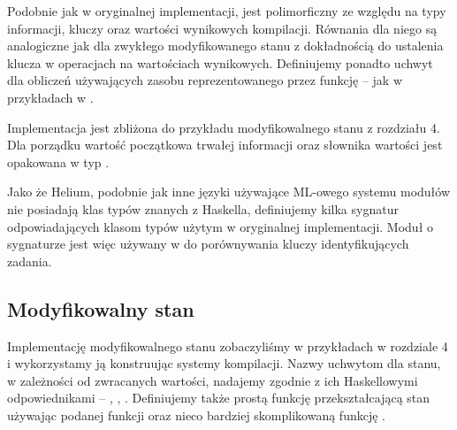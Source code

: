 Podobnie jak  w oryginalnej implementacji,  jest polimorficzny ze względu na typy informacji, kluczy oraz wartości wynikowych kompilacji. Równania dla niego są analogiczne jak dla zwykłego modyfikowanego stanu z dokładnością do ustalenia klucza w operacjach na wartościach wynikowych. Definiujemy ponadto uchwyt  dla obliczeń używających zasobu reprezentowanego przez funkcję -- jak w przykładach w \BSaLC.



Implementacja jest zbliżona do przykładu modyfikowalnego stanu z rozdziału 4. Dla porządku wartość początkowa trwałej informacji oraz słownika wartości jest opakowana w typ .

Jako że Helium, podobnie jak inne języki używające ML-owego systemu modułów nie posiadają klas typów znanych z Haskella, definiujemy kilka sygnatur odpowiadających klasom typów użytym w oryginalnej implementacji. Moduł o sygnaturze  jest więc używany w  do porównywania kluczy identyfikujących zadania.

\begin{minipage}[t]{.45\textwidth}

  

\end{minipage}\hfill
\begin{minipage}[t]{.45\textwidth}

  

\end{minipage}

\subsection{Modyfikowalny stan}

Implementację modyfikowalnego stanu zobaczyliśmy w przykładach w rozdziale 4 i wykorzystamy ją konstruując systemy kompilacji. Nazwy uchwytom dla stanu, w zależności od zwracanych wartości, nadajemy zgodnie z ich Haskellowymi odpowiednikami -- , , . Definiujemy także prostą funkcję  przekształcającą stan używając podanej funkcji oraz nieco bardziej skomplikowaną funkcję .

